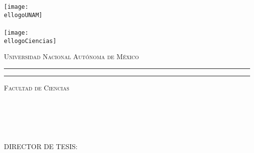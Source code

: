 
\begin{changemargin}{0cm}{0cm}
\thispagestyle{empty}
\begin{center}
\hskip-1cm
\vskip1.5cm
\begin{minipage}[c][14cm][s]{0.2\textwidth} 
  \begin{center}
    \texttt{[image: \\ellogoUNAM]}\\[10pt] %
    \hskip2pt\vrule width2pt height13cm\hskip1mm
    \vrule width1pt height13cm\\[10pt]
    \texttt{[image: \\ellogoCiencias]} %
  \end{center}
\end{minipage} \quad
\begin{minipage}[c][14cm][s]{0.7\textwidth}
  \begin{center}
    {\Large \scshape Universidad Nacional Aut\'onoma de M\'exico}
    \vspace{.3cm}
    \hrule height2pt
    \vspace{.1cm}
    \hrule height1pt
    \vspace{.3cm}
    {\scshape \large Facultad de Ciencias}

    \vspace{3cm}

    {\huge \scshape \rmfamily \eltituloTesis} %

    \vspace{3cm}

    \\[25pt]
    \\[10pt]
    \begin{center}{\scshape \large \elTitulo}\end{center}%
    \\[10pt]
    \begin{center}{{\scshape \elnombre} \hspace{2ex} {\scshape \elApPaterno} \hspace{2ex} {\scshape \elApMaterno}}\end{center}

    \vspace{1.5cm}

    {\small DIRECTOR DE TESIS:\\ \uppercase{\eldirector}}

    \vspace{1cm}

    \lafecha
    
  \end{center}
\end{minipage}
\end{center}
\end{changemargin}
